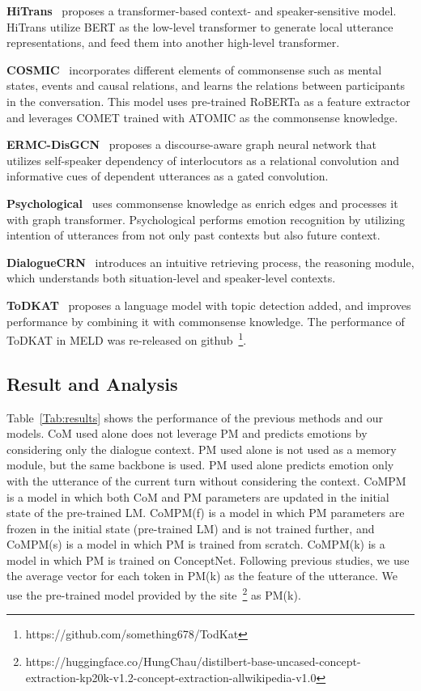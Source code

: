\documentclass[11pt]{article}
\begin{document}
\textbf{HiTrans}~\cite{li-etal-2020-hitrans} proposes a transformer-based context- and speaker-sensitive model. HiTrans utilize BERT as the low-level transformer to generate local utterance representations, and feed them into another high-level transformer.

\textbf{COSMIC}~\cite{ghosal-etal-2020-cosmic} incorporates different elements of commonsense such as mental states, events and causal relations, and learns the relations between participants in the conversation. This model uses pre-trained RoBERTa as a feature extractor and leverages COMET trained with ATOMIC as the commonsense knowledge.


\textbf{ERMC-DisGCN}~\cite{sun-etal-2021-discourse-aware} proposes a discourse-aware graph neural network that utilizes self-speaker dependency of interlocutors as a relational convolution and informative cues of dependent utterances as a gated convolution.


\textbf{Psychological}~\cite{li-etal-2021-past-present} uses commonsense knowledge as enrich edges and processes it with graph transformer. Psychological performs emotion recognition by utilizing intention of utterances from not only past contexts but also future context.


\textbf{DialogueCRN}~\cite{hu-etal-2021-dialoguecrn} introduces an intuitive retrieving process, the reasoning module, which understands both situation-level and speaker-level contexts.

\textbf{ToDKAT}~\cite{zhu-etal-2021-topic} proposes a language model with topic detection added, and improves performance by combining it with commonsense knowledge.  The performance of ToDKAT in MELD was re-released on github~\footnote{https://github.com/something678/TodKat}.


\subsection{Result and Analysis}
Table~\ref{Tab:results} shows the performance of the previous methods and our models. CoM used alone does not leverage PM and predicts emotions by considering only the dialogue context. PM used alone is not used as a memory module, but the same backbone is used. PM used alone predicts emotion only with the utterance of the current turn without considering the context. CoMPM is a model in which both CoM and PM parameters are updated in the initial state of the pre-trained LM. CoMPM(f) is a model in which PM parameters are frozen in the initial state (pre-trained LM) and is not trained further, and CoMPM(s) is a model in which PM is trained from scratch. CoMPM(k) is a model in which PM is trained on ConceptNet. Following previous studies, we use the average vector for each token in PM(k) as the feature of the utterance. We use the pre-trained model provided by the site~\footnote{https://huggingface.co/HungChau/distilbert-base-uncased-concept-extraction-kp20k-v1.2-concept-extraction-allwikipedia-v1.0} as PM(k).
\end{document}
